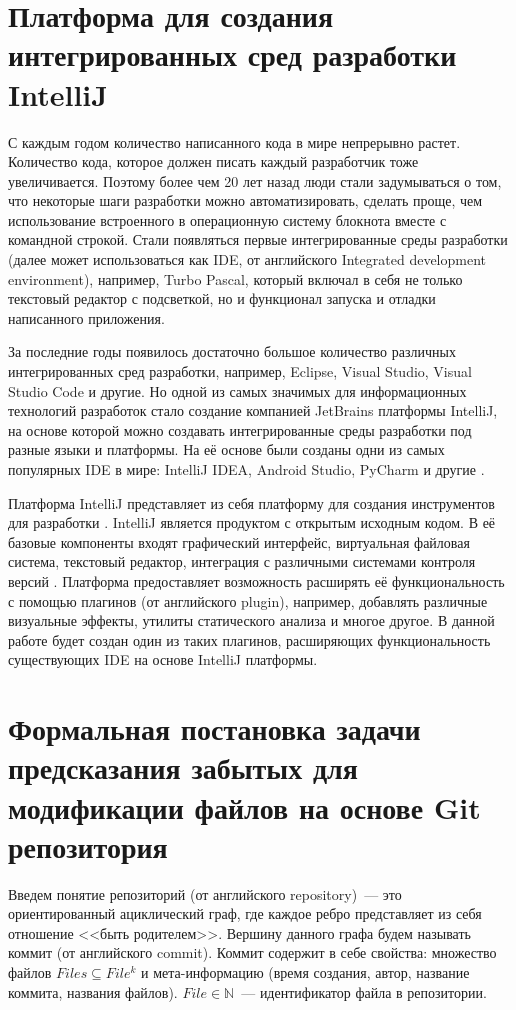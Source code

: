 \section{Платформа для создания интегрированных сред разработки IntelliJ}\label{chapter1-intellij}
С каждым годом количество написанного кода в мире непрерывно растет. Количество кода, которое должен писать каждый разработчик тоже увеличивается. Поэтому более чем 20 лет назад люди стали задумываться о том, что некоторые шаги разработки можно автоматизировать, сделать проще, чем использование встроенного в операционную систему блокнота вместе с командной строкой. Стали появляться первые интегрированные среды разработки (далее может использоваться как IDE, от английского Integrated development environment), например, Turbo Pascal, который включал в себя не только текстовый редактор с подсветкой, но и функционал запуска и отладки написанного приложения.

За последние годы появилось достаточно большое количество различных интегрированных сред разработки, например, Eclipse, Visual Studio, Visual Studio Code и другие. Но одной из самых значимых для информационных технологий разработок стало создание компанией JetBrains платформы IntelliJ, на основе которой можно создавать интегрированные среды разработки под разные языки и платформы. На её основе были созданы одни из самых популярных IDE в мире: IntelliJ IDEA, Android Studio, PyCharm и другие \cite{top-ide}.

Платформа IntelliJ представляет из себя платформу для создания инструментов для разработки \cite{intellij-top}. IntelliJ является продуктом с открытым исходным кодом. В её базовые компоненты входят графический интерфейс, виртуальная файловая система, текстовый редактор, интеграция с различными системами контроля версий \cite{intellij-top}. Платформа предоставляет возможность расширять её функциональность с помощью плагинов (от английского plugin), например, добавлять различные визуальные эффекты, утилиты статического анализа и многое другое. В данной работе будет создан один из таких плагинов, расширяющих функциональность существующих IDE на основе IntelliJ платформы.


\section{Формальная постановка задачи предсказания забытых для модификации файлов на основе Git репозитория}\label{requirements}
Введем понятие репозиторий (от английского repository)~--- это ориентированный ациклический граф, где каждое ребро представляет из себя отношение <<быть родителем>>. Вершину данного графа будем называть коммит (от английского commit). Коммит содержит в себе свойства: множество файлов $Files \subseteq File^k$ и мета-информацию (время создания, автор, название коммита, названия файлов). $File \in \mathbb{N}$~--- идентификатор файла в репозитории.\\
